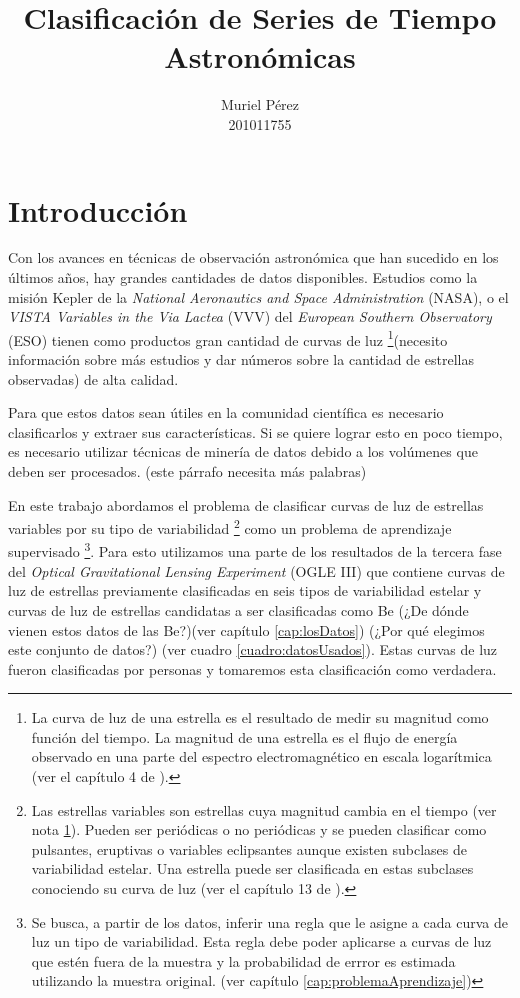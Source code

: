 \documentclass[letterpaper,12pt]{book}
\title{Clasificación de Series de Tiempo Astronómicas}
\author{Muriel Pérez\\ 201011755}
\begin{document}
\maketitle
\tableofcontents 
\chapter{Introducción}

Con los avances en técnicas de observación astronómica que han sucedido en los últimos años, hay grandes cantidades de datos disponibles. Estudios como la misión Kepler de la \textit{National Aeronautics and Space Administration} (NASA), o el \textit{VISTA Variables in the Via Lactea} (VVV) del \textit{European Southern Observatory} (ESO) tienen como productos gran cantidad de curvas  de luz \footnote{\label{nota:curvasDeLuz} La curva de luz de una estrella es el resultado de medir su magnitud como función del tiempo. La magnitud de una estrella es el flujo de energía observado en una parte del espectro electromagnético en escala logarítmica (ver el capítulo 4 de \cite{karttunen_fundamental_2007}).}(necesito información sobre más estudios y dar números sobre la cantidad de estrellas observadas) de alta calidad.

Para que estos datos sean útiles en la comunidad científica es necesario clasificarlos y extraer sus características. Si se quiere lograr esto en poco tiempo, es necesario utilizar técnicas de minería de datos debido a los volúmenes que deben ser procesados. (este párrafo necesita más palabras)

En este trabajo abordamos el problema de clasificar curvas de luz de estrellas variables por su tipo de variabilidad \footnote{Las estrellas variables son estrellas cuya magnitud cambia en el tiempo (ver nota \ref{nota:curvasDeLuz}). Pueden ser periódicas o no periódicas y se pueden clasificar como pulsantes, eruptivas o variables eclipsantes aunque existen subclases de variabilidad estelar. Una estrella puede ser clasificada en estas subclases conociendo su curva de luz (ver el capítulo 13 de \cite{karttunen_fundamental_2007}).} como un problema de aprendizaje supervisado \footnote{Se busca, a partir de los datos, inferir una regla que le asigne a cada curva de luz un tipo de variabilidad. Esta regla debe poder aplicarse a curvas de luz que estén fuera de la muestra y la probabilidad de errror es estimada utilizando la muestra original. (ver capítulo \ref{cap:problemaAprendizaje})}. Para esto utilizamos una parte de los resultados de la tercera fase del \textit{Optical Gravitational Lensing Experiment} (OGLE III) que contiene curvas de luz  de estrellas previamente clasificadas en seis tipos de variabilidad estelar y curvas de luz de estrellas candidatas a ser clasificadas como Be (¿De dónde vienen estos datos de las Be?)(ver capítulo \ref{cap:losDatos}) (¿Por qué elegimos este conjunto de datos?) (ver cuadro \ref{cuadro:datosUsados}). Estas curvas de luz fueron clasificadas por personas y tomaremos esta clasificación como verdadera.
\end{document}
